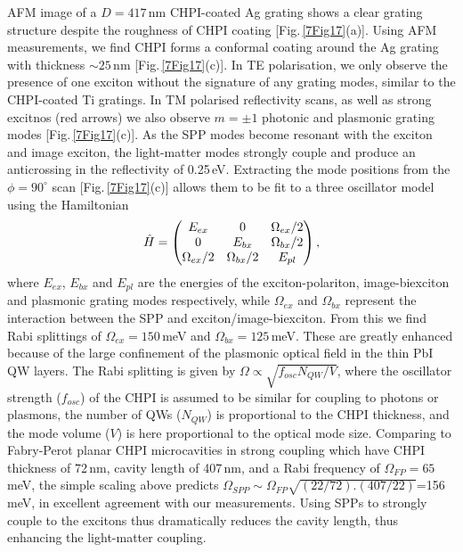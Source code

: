 AFM image of a $D=417$\,nm CHPI-coated Ag grating shows a clear grating structure despite the roughness of CHPI coating [Fig.\,\ref{7Fig17}(a)]. Using AFM measurements, we find CHPI forms a conformal coating around the Ag grating with thickness $\sim25$\,nm [Fig.\,\ref{7Fig17}(c)]. In TE polarisation, we only observe the presence of one exciton without the signature of any grating modes, similar to the CHPI-coated Ti gratings. In TM polarised reflectivity scans, as well as strong excitnos (red arrows) we also observe $m=\pm1$ photonic and plasmonic grating modes [Fig.\,\ref{7Fig17}(c)].  As the SPP modes become resonant with the exciton and image exciton, the light-matter modes strongly couple and produce an anticrossing in the reflectivity of 0.25\,eV. Extracting the mode positions from the $\phi=90^{\circ}$ scan [Fig.\,\ref{7Fig17}(c)] allows them to be fit to a three oscillator model using the Hamiltonian
\begin{equation}
\centering 
\hat{H}=\left( \begin{matrix} 
E_{ex} & 0 & \Omega_{ex}/2 \\
0 & E_{bx} & \Omega_{bx}/2 \\
\Omega_{ex}/2 & \Omega_{bx}/2 & E_{pl} 
\end{matrix} \right) ,
\end{equation}
where $E_{ex}$, $E_{bx}$ and $E_{pl}$ are the energies of the exciton-polariton, image-biexciton and plasmonic grating modes respectively, while $\Omega_{ex}$ and $\Omega_{bx}$ represent the interaction between the SPP and exciton/image-biexciton. From this we find Rabi splittings of $\Omega_{ex}=150$\,meV and $\Omega_{bx}=125$\,meV. 
These are greatly enhanced because of the large confinement of the plasmonic optical field in the thin PbI QW layers. The Rabi splitting is given by $\Omega \propto \sqrt{f_{osc} N_{QW}/V}$, where the oscillator strength ($f_{osc}$) of the CHPI is assumed to be similar for coupling to photons or plasmons, the number of QWs ($N_{QW}$) is proportional to the CHPI thickness, and the mode volume ($V$) is here proportional to the optical mode size. Comparing to Fabry-Perot planar CHPI microcavities in strong coupling \cite{Pradeesh2009b} which have CHPI thickness of 72\,nm, cavity length of 407\,nm, and a Rabi frequency of $\Omega_{FP}=65$\,meV, the simple scaling above predicts $\Omega_{SPP} \sim \Omega_{FP} \sqrt{(22/72).(407/22)}$=156\,meV, in excellent agreement with our measurements. Using SPPs to strongly couple to the excitons thus dramatically reduces the cavity length, thus enhancing the light-matter coupling.

